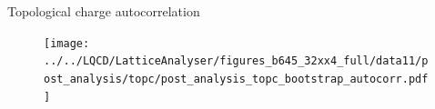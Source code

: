 \documentclass[10pt,show notes on second screen]{beamer}
\begin{document}
\begin{frame}{Topological charge autocorrelation}
\vspace{-5.0pt}
\begin{figure}
    \centering
    \texttt{[image: ../../LQCD/LatticeAnalyser/figures\_b645\_32xx4\_full/data11/post\_analysis/topc/post\_analysis\_topc\_bootstrap\_autocorr.pdf]}
\end{figure}
\end{frame}

\end{document}
